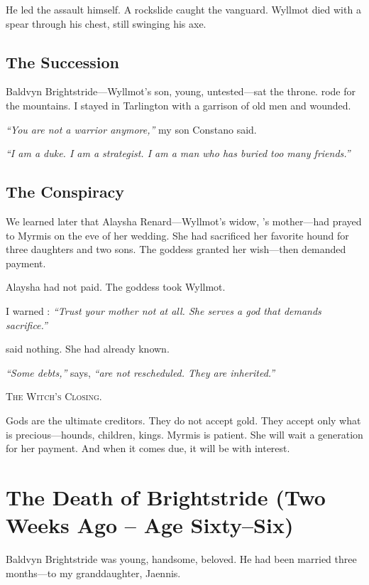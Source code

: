 \documentclass[11pt,a5paper]{book}
\newenvironment{witchclosing}
  {\begin{quoting}[font={small\itshape}, leftmargin=2em, rightmargin=2em]\noindent\textsc{The Witch's Closing.}\par}
  {\end{quoting}}
\begin{document}
He led the assault himself. A rockslide caught the vanguard. Wyllmot died with a spear through his chest, still swinging his axe.

\section*{The Succession}
Baldvyn Brightstride---Wyllmot's son, young, untested---sat the throne. \veralyn{} rode for the mountains. I stayed in Tarlington with a garrison of old men and wounded.

\textit{``You are not a warrior anymore,''} my son Constano said.

\textit{``I am a duke. I am a strategist. I am a man who has buried too many friends.''}

\section*{The Conspiracy}
We learned later that Alaysha Renard---Wyllmot's widow, \veralyn's mother---had prayed to Myrmis on the eve of her wedding. She had sacrificed her favorite hound for three daughters and two sons. The goddess granted her wish---then demanded payment.

Alaysha had not paid. The goddess took Wyllmot.

I warned \veralyn: \textit{``Trust your mother not at all. She serves a god that demands sacrifice.''}

\veralyn{} said nothing. She had already known.

\vspace{1em}
\noindent\textit{``Some debts,''} \braedon{} says, \textit{``are not rescheduled. They are inherited.''}

\begin{witchclosing}
Gods are the ultimate creditors. They do not accept gold. They accept only what is precious---hounds, children, kings. Myrmis is patient. She will wait a generation for her payment. And when it comes due, it will be with interest.
\end{witchclosing}

\clearpage

\chapter{The Death of Brightstride (Two Weeks Ago -- Age Sixty--Six)}

\epigraph{Baldvyn Brightstride was young, handsome, beloved. He had been married three months---to my granddaughter, Jaennis.}{\braedon}
\end{document}
